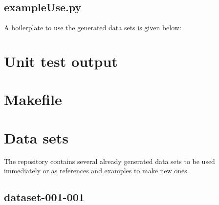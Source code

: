 \begin{scriptsize}
\begin{ttfamily}

\end{ttfamily}
\end{scriptsize}

\subsection{exampleUse.py}

A boilerplate to use the generated data sets is given below:
 
\begin{scriptsize}
\begin{ttfamily}

\end{ttfamily}
\end{scriptsize}

\section{Unit test output}

\begin{scriptsize}
\begin{ttfamily}

\end{ttfamily}
\end{scriptsize}

\section{Makefile}

\begin{scriptsize}
\begin{ttfamily}

\end{ttfamily}
\end{scriptsize}

\section{Data sets}

The repository contains several already generated data sets to be used immediately or as references and examples to make new ones.

\subsection{dataset-001-001}

